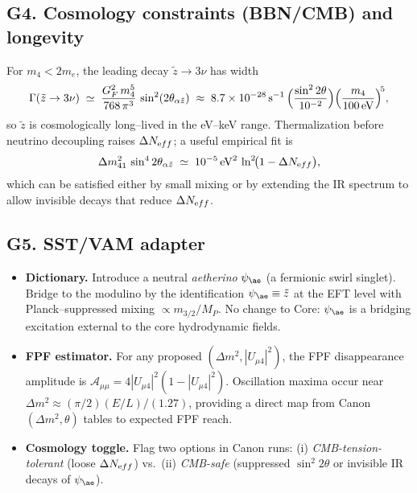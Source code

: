 \documentclass[11pt]{article}
\begin{document}
      \subsection*{G4. Cosmology constraints (BBN/CMB) and longevity}
          For $m_4<2m_e$, the leading decay $\tilde z\!\to\!3\nu$ has width
          \begin{equation}
          \Gamma(\tilde z\to 3\nu)\;\simeq\;
          \frac{G_F^2\,m_4^5}{768\,\pi^3}\,\sin^2(2\theta_{\alpha\tilde z})
          \;\approx\;
          8.7\times 10^{-28}\,\mathrm{s}^{-1}\,
          \Bigl(\frac{\sin^2 2\theta}{10^{-2}}\Bigr)
          \Bigl(\frac{m_4}{100\,\mathrm{eV}}\Bigr)^{\!5},
          \end{equation}
          so $\tilde z$ is cosmologically long--lived in the eV--keV range. Thermalization before neutrino decoupling raises $\Delta N_{\textrm eff}$; a useful empirical fit is
          \begin{equation}
          \Delta m^2_{41}\,\sin^4 2\theta_{\alpha\tilde z}
          \;\simeq\;
          10^{-5}\,\mathrm{eV}^2\,
          \ln^2\!\bigl(1-\Delta N_{\textrm eff}\bigr),
          \end{equation}
          which can be satisfied either by small mixing or by extending the IR spectrum to allow invisible decays that reduce $\Delta N_{\textrm eff}$.

      \subsection*{G5. SST/VAM adapter}
          \begin{itemize}
          \item \textbf{Dictionary.} Introduce a neutral \emph{aetherino} $\psi_{\ae}$ (a fermionic swirl singlet). Bridge to the modulino by the identification $\psi_{\ae}\equiv\tilde z$ at the EFT level with Planck--suppressed mixing $\propto m_{3/2}/M_P$. No change to Core: $\psi_{\ae}$ is a bridging excitation external to the core hydrodynamic fields.
          \item \textbf{FPF estimator.} For any proposed $(\Delta m^2,|U_{\mu4}|^2)$, the FPF disappearance amplitude is
          $\mathcal A_{\mu\mu}=4|U_{\mu4}|^2(1-|U_{\mu4}|^2)$.
          Oscillation maxima occur near
          $\Delta m^2\!\approx\! (\pi/2)(E/L)/(1.27)$, providing a direct map from Canon $(\Delta m^2,\theta)$ tables to expected FPF reach.
          \item \textbf{Cosmology toggle.} Flag two options in Canon runs:
          (i) \emph{CMB-tension-tolerant} (loose $\Delta N_{\textrm eff}$) vs.\ (ii) \emph{CMB-safe} (suppressed $\sin^2 2\theta$ or invisible IR decays of $\psi_{\ae}$).
          \end{itemize}
\end{document}
